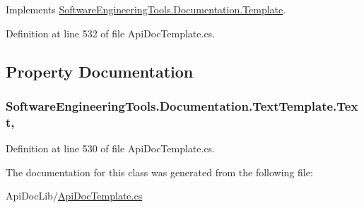 Implements \hyperlink{class_software_engineering_tools_1_1_documentation_1_1_template_ab13b45a10b7eb65a0b6c15dbc1318664}{Software\+Engineering\+Tools.\+Documentation.\+Template}.



Definition at line 532 of file Api\+Doc\+Template.\+cs.



\subsection{Property Documentation}
\hypertarget{class_software_engineering_tools_1_1_documentation_1_1_text_template_a78de805f62206a738997a7d6cb591330}{
\subsubsection[{Text}]{ Software\+Engineering\+Tools.\+Documentation.\+Text\+Template.\+Text\hspace{0.3cm}{\ttfamily [get]}, {\ttfamily [set]}}}\label{class_software_engineering_tools_1_1_documentation_1_1_text_template_a78de805f62206a738997a7d6cb591330}


Definition at line 530 of file Api\+Doc\+Template.\+cs.



The documentation for this class was generated from the following file\+:\begin{DoxyCompactItemize}
\item 
Api\+Doc\+Lib/\hyperlink{_api_doc_template_8cs}{Api\+Doc\+Template.\+cs}\end{DoxyCompactItemize}
